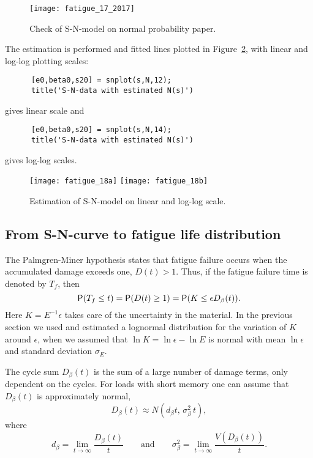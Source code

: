 \begin{figure}
\centering
\texttt{[image: fatigue\_17\_2017]}
\vspace{-3mm}
\caption[Check of S-N-model on normal probability paper]
{Check of S-N-model on normal probability paper.}
\label{fig_wafo_6.14}
\end{figure}

The estimation is performed and fitted lines plotted in
Figure~\ref{fig_wafo_6.15}, with linear and log-log plotting scales:
{\small\begin{verbatim}
      [e0,beta0,s20] = snplot(s,N,12);
      title('S-N-data with estimated N(s)')
\end{verbatim}}
\noindent gives linear scale and
{\small\begin{verbatim}
      [e0,beta0,s20] = snplot(s,N,14);
      title('S-N-data with estimated N(s)')
\end{verbatim}}
\noindent gives log-log scales.

\begin{figure}
\centering
\texttt{[image: fatigue\_18a]}%
\hspace{5mm}
\texttt{[image: fatigue\_18b]}
\vspace{-3mm}
\caption[Estimation of S-N-model on linear and log-log scale]
{Estimation of S-N-model on linear and log-log scale.}
\label{fig_wafo_6.15}
\end{figure}

\subsection{From S-N-curve to fatigue life distribution}
\label{sec:fatiguelifedistribution}

The Palmgren-Miner hypothesis states that fatigue failure occurs
when the accumulated damage exceeds one, $D(t) > 1$.
Thus, if the fatigue failure time is denoted by $T_f$, then
$$
\mbox{\sf P}(T_f \leq t) = \mbox{\sf P}(D(t) \geq 1) = \mbox{\sf P}(K \leq \epsilon D_\beta (t)).
$$
Here $K=E^{-1}\epsilon$ takes care of the uncertainty in the material.
In the previous section we used and estimated a lognormal distribution
for the variation of $K$ around $\epsilon$, when we assumed
that $\ln K = \ln \epsilon - \ln E$ is normal with
mean $\ln \epsilon$ and standard deviation $\sigma _E$.

The cycle sum $D_\beta(t)$ is the sum of a large number of damage
terms, only dependent on the cycles. For loads with short memory
one can assume that $D_\beta(t)$ is approximately normal,
$$
D_\beta(t) \approx N(d_\beta t,\, \sigma_\beta ^2 \,t),
$$
where
$$
d_\beta = \lim _{t \to \infty} \frac{D_\beta (t)}{t} \qquad \mbox{and} \qquad
\sigma_\beta ^2 =  \lim _{t \to \infty} \frac{V(D_\beta (t))}{t}.
$$

